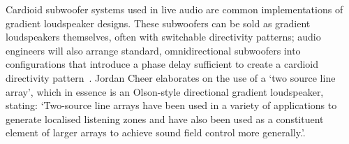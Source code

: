\documentclass{report}
\begin{document}
        Cardioid subwoofer systems used in live audio are common implementations of gradient loudspeaker designs.
        These subwoofers can be sold as gradient loudspeakers themselves, often with switchable directivity patterns; audio engineers will also arrange standard, omnidirectional subwoofers into configurations that introduce a phase delay sufficient to create a cardioid directivity pattern~\cite{curtis2022cardioidsubs}.
        Jordan Cheer elaborates on the use of a `two source line array', which in essence is an Olson-style directional gradient loudspeaker, stating: `Two-source line arrays have been used in a variety of applications to generate localised listening zones and have also been used as a constituent element of larger arrays to achieve sound field control more generally.'\cite{cheer2015robustness}.
\end{document}
